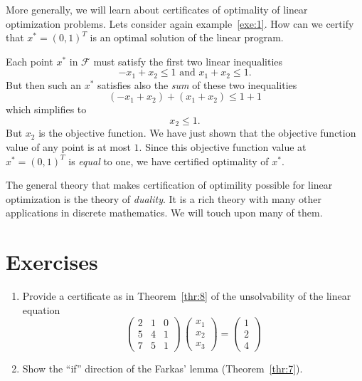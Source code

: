 \bigskip

More generally, we will learn about certificates of optimality of linear optimization problems. Lets consider again example~\ref{exe:1}. How can we certify that $x^* = (0,1)^T$ is an optimal solution of the linear program.

Each point $x^*$ in $ℱ$ must satisfy the first two linear inequalities
\begin{displaymath}
  -x_1 + x_2 ≤ 1 \text{ and }  x_1 + x_2 ≤ 1. 
\end{displaymath}
But then such an $x^*$ satisfies also the \emph{sum} of these two inequalities
\begin{displaymath}
   (-x_1 + x_2) + (x_1 + x_2) ≤ 1  +1 
 \end{displaymath}
 which simplifies to
 \begin{displaymath}
x_2 ≤1. 
 \end{displaymath}
 But $x_2$ is the objective function. We have just shown that the objective function value of any point is at most $1$. Since this objective function value at $x^* = (0,1)^T$ is \emph{equal} to one, we have certified optimality of $x^*$.

 \bigskip

The general theory that makes certification of optimility possible for linear optimization is the theory of \emph{duality}. It is a rich theory with many other applications in discrete mathematics. We will touch upon many of them.

 




\section*{Exercises}

\begin{enumerate}[1)]
\item Provide a certificate as in Theorem~\ref{thr:8} of the unsolvability of the linear equation 
  \begin{displaymath}
    \begin{pmatrix}
      2 & 1 & 0 \\
      5 & 4 & 1 \\
      7 & 5 & 1
    \end{pmatrix} \,
    \begin{pmatrix}
      x_1 \\ x_2 \\ x_3 
    \end{pmatrix} =
    \begin{pmatrix}
      1\\2\\4
    \end{pmatrix}
  \end{displaymath}
\item Show the ``if'' direction of the Farkas' lemma (Theorem~\ref{thr:7}). 
\end{enumerate}



 

